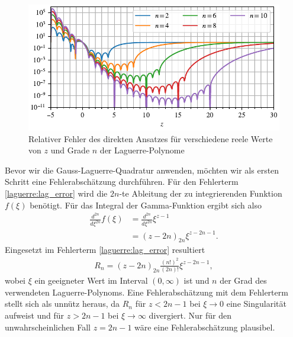 \begin{figure}
\centering
% 
\includegraphics{papers/laguerre/images/rel_error_simple.pdf}
\caption{Relativer Fehler des direkten Ansatzes
für verschiedene reele Werte von $z$ und Grade $n$ der Laguerre-Polynome}
\label{laguerre:fig:rel_error_simple}
\end{figure}

Bevor wir die Gauss-Laguerre-Quadratur anwenden,
möchten wir als ersten Schritt eine Fehlerabschätzung durchführen.
Für den Fehlerterm \eqref{laguerre:lag_error} wird die $2n$-te Ableitung
der zu integrierenden Funktion $f(\xi)$ benötigt.
Für das Integral der Gamma-Funktion ergibt sich also
\begin{align*}
\frac{d^{2n}}{d\xi^{2n}} f(\xi)
 & =
\frac{d^{2n}}{d\xi^{2n}} \xi^{z-1}
\\
 & =
(z - 2n)_{2n} \xi^{z - 2n - 1}
.
\end{align*}
Eingesetzt im Fehlerterm \eqref{laguerre:lag_error} resultiert
\begin{align}
R_n
=
(z - 2n)_{2n} \frac{(n!)^2}{(2n)!} \xi^{z-2n-1}
,
\label{laguerre:gamma_err_simple}
\end{align}
wobei $\xi$ ein geeigneter Wert im Interval $(0, \infty)$ ist
und $n$ der Grad des verwendeten Laguerre-Polynoms.
Eine Fehlerabschätzung mit dem Fehlerterm stellt sich als unnütz heraus,
da $R_n$ für $z < 2n - 1$ bei $\xi \rightarrow 0$ eine Singularität aufweist
und für $z > 2n - 1$ bei $\xi \rightarrow \infty$ divergiert.
Nur für den unwahrscheinlichen Fall $ z = 2n - 1$
wäre eine Fehlerabschätzung plausibel.

